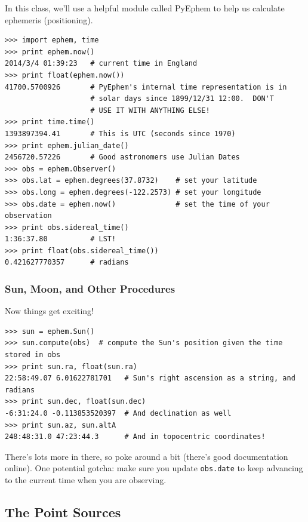 \documentclass[11pt,preprint]{aastex}
\begin{document}
In this class, we'll use a helpful module called PyEphem to help us calculate ephemeris (positioning).
\begin{verbatim}
>>> import ephem, time
>>> print ephem.now()
2014/3/4 01:39:23   # current time in England
>>> print float(ephem.now())
41700.5700926       # PyEphem's internal time representation is in 
                    # solar days since 1899/12/31 12:00.  DON'T
                    # USE IT WITH ANYTHING ELSE!
>>> print time.time()
1393897394.41       # This is UTC (seconds since 1970)
>>> print ephem.julian_date()
2456720.57226       # Good astronomers use Julian Dates
>>> obs = ephem.Observer()
>>> obs.lat = ephem.degrees(37.8732)    # set your latitude
>>> obs.long = ephem.degrees(-122.2573) # set your longitude
>>> obs.date = ephem.now()              # set the time of your observation
>>> print obs.sidereal_time()
1:36:37.80          # LST!
>>> print float(obs.sidereal_time())
0.421627770357      # radians
\end{verbatim}

\subsubsection{Sun, Moon, and Other Procedures}

Now things get exciting!

\begin{verbatim}
>>> sun = ephem.Sun()
>>> sun.compute(obs)  # compute the Sun's position given the time stored in obs
>>> print sun.ra, float(sun.ra)
22:58:49.07 6.01622781701   # Sun's right ascension as a string, and radians
>>> print sun.dec, float(sun.dec)
-6:31:24.0 -0.113853520397  # And declination as well
>>> print sun.az, sun.altA
248:48:31.0 47:23:44.3      # And in topocentric coordinates!
\end{verbatim}

There's lots more in there, so poke around a bit (there's good documentation online).
One potential gotcha: make sure you update \verb+obs.date+ to keep advancing
to the current time when you are observing.

\subsection{The Point Sources}
\label{sec:point_srcs}
\end{document}
